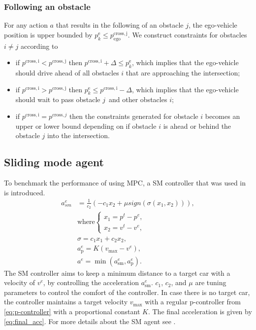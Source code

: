 \subsubsection{Following an obstacle}
For any action $a$ that results in the following of an obstacle $j$, the ego-vehicle position is upper bounded by $p^\mathrm{e}_k \leq{} p^\mathrm{cross,j}_\mathrm{ego}$. We construct constraints for obstacles $i\neq{}j$ according to
\begin{itemize}
	\item if $p^\mathrm{cross,i}<{}p^\mathrm{cross,j}$ then $p^\mathrm{cross,i}+\Delta\leq{}p_k^\mathrm{e}$, which implies that the ego-vehicle should drive ahead of all obstacles $i$ that are approaching the intersection;
	\item if $p^\mathrm{cross,i}>{}p^\mathrm{cross,j}$ then $p_k^\mathrm{e}\leq{}p^\mathrm{cross,i}-\Delta$, which implies that the ego-vehicle should wait to pass obstacle $j$ and other obstacles $i$;
	\item if $p^{\mathrm{cross,i}}=p^{\mathrm{cross},j}$ then the constraints generated for obstacle $i$ becomes an upper or lower  bound depending on if obstacle $i$ is ahead or behind the obstacle $j$ into the intersection.
\end{itemize}

\subsection{Sliding mode agent}
To benchmark the performance of using MPC, a SM controller that was used in \cite{Tram2018LearningQ-Learning} is introduced. 
\begin{subequations}
	\label{eq:sliding_mode}
	\begin{align}
	a^e_{sm} &= \frac{1}{c_2} (- c_1 x_2 + \mu sign(\sigma(x_1, x_2))), \\
	&\text{where}
	\begin{cases}
	x_1 = p^t - p^e,\\
	x_2 = v^t - v^e,
	\end{cases}\\
	&\sigma = c_1 x_1 + c_2 x_2,\\
	\label{eq:p-controller}
	&a^e_\mathrm{p} = K (v_{\mathrm{max}} - v^e),\\
	\label{eq:final_acc}
	&a^e = \min(a^e_{\mathrm{sm}}, a^e_\mathrm{p} ).
	\end{align}
\end{subequations}
The SM controller aims to keep a minimum distance to a target car with a velocity of $v^e$, by controlling the acceleration $a^e_{\mathrm{sm}}$. $c_1$, $c_2$, and  $\mu$ are tuning parameters to control the comfort of the controller. In case there is no target car, the controller maintains a target velocity $v_{\mathrm{max}}$ with a regular p-controller from \eqref{eq:p-controller} with a proportional constant $K$. The final acceleration is given by \eqref{eq:final_acc}. For more details about the SM agent see \cite{Tram2018LearningQ-Learning}.

